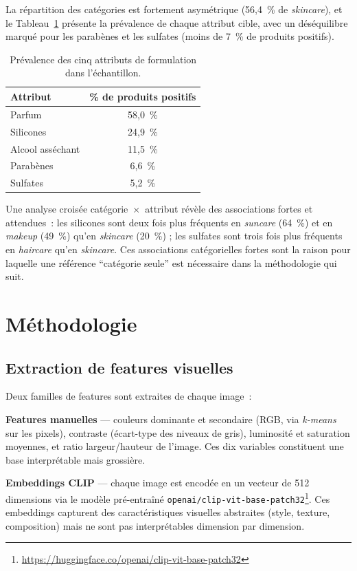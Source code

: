 \documentclass[11pt,a4paper]{article}
\begin{document}
La répartition des catégories est fortement asymétrique (56{,}4~\% de \emph{skincare}), et le Tableau~\ref{tab:targets} présente la prévalence de chaque attribut cible, avec un déséquilibre marqué pour les parabènes et les sulfates (moins de 7~\% de produits positifs).

\begin{table}[h]
\centering
\begin{tabular}{lc}
\toprule
\textbf{Attribut} & \textbf{\% de produits positifs} \\
\midrule
Parfum & 58{,}0~\% \\
Silicones & 24{,}9~\% \\
Alcool asséchant & 11{,}5~\% \\
Parabènes & 6{,}6~\% \\
Sulfates & 5{,}2~\% \\
\bottomrule
\end{tabular}
\caption{Prévalence des cinq attributs de formulation dans l'échantillon.}
\label{tab:targets}
\end{table}

Une analyse croisée catégorie~$\times$~attribut révèle des associations fortes et attendues~: les silicones sont deux fois plus fréquents en \emph{suncare} (64~\%) et en \emph{makeup} (49~\%) qu'en \emph{skincare} (20~\%) ; les sulfates sont trois fois plus fréquents en \emph{haircare} qu'en \emph{skincare}. Ces associations catégorielles fortes sont la raison pour laquelle une référence ``catégorie seule'' est nécessaire dans la méthodologie qui suit.

\section{Méthodologie}

\subsection{Extraction de features visuelles}

Deux familles de features sont extraites de chaque image~:

\textbf{Features manuelles} --- couleurs dominante et secondaire (RGB, via \emph{k-means} sur les pixels), contraste (écart-type des niveaux de gris), luminosité et saturation moyennes, et ratio largeur/hauteur de l'image. Ces dix variables constituent une base interprétable mais grossière.

\textbf{Embeddings CLIP} --- chaque image est encodée en un vecteur de 512 dimensions via le modèle pré-entraîné \texttt{openai/clip-vit-base-patch32}\footnote{\url{https://huggingface.co/openai/clip-vit-base-patch32}}. Ces embeddings capturent des caractéristiques visuelles abstraites (style, texture, composition) mais ne sont pas interprétables dimension par dimension.
\end{document}
